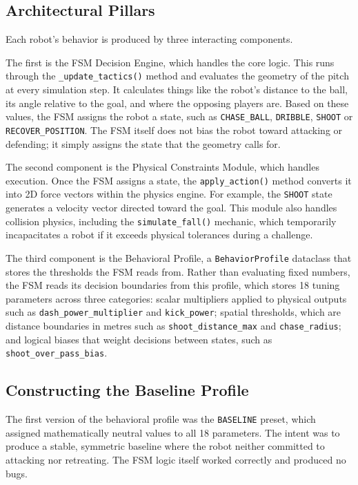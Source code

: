 \documentclass[12pt, a4paper]{report}
\begin{document}
\subsection{Architectural Pillars}

Each robot's behavior is produced by three interacting components.

The first is the FSM Decision Engine, which handles the core logic.
This runs through the \texttt{\_update\_tactics()} method and evaluates
the geometry of the pitch at every simulation step.
It calculates things like the robot's distance to the ball, its angle
relative to the goal, and where the opposing players are.
Based on these values, the FSM assigns the robot a state, such as
\texttt{CHASE\_BALL}, \texttt{DRIBBLE}, \texttt{SHOOT} or
\texttt{RECOVER\_POSITION}.
The FSM itself does not bias the robot toward attacking or defending;
it simply assigns the state that the geometry calls for.

The second component is the Physical Constraints Module, which handles
execution.
Once the FSM assigns a state, the \texttt{apply\_action()} method converts
it into 2D force vectors within the physics engine.
For example, the \texttt{SHOOT} state generates a velocity vector directed
toward the goal.
This module also handles collision physics, including the
\texttt{simulate\_fall()} mechanic, which temporarily incapacitates a robot
if it exceeds physical tolerances during a challenge.

The third component is the Behavioral Profile, a \texttt{BehaviorProfile}
dataclass that stores the thresholds the FSM reads from.
Rather than evaluating fixed numbers, the FSM reads its decision boundaries
from this profile, which stores 18 tuning parameters across three categories:
scalar multipliers applied to physical outputs such as
\texttt{dash\_power\_multiplier} and \texttt{kick\_power};
spatial thresholds, which are distance boundaries in metres such as
\texttt{shoot\_distance\_max} and \texttt{chase\_radius}; and
logical biases that weight decisions between states, such as
\texttt{shoot\_over\_pass\_bias}.

\subsection{Constructing the Baseline Profile}

The first version of the behavioral profile was the \texttt{BASELINE} preset,
which assigned mathematically neutral values to all 18 parameters.
The intent was to produce a stable, symmetric baseline where the robot
neither committed to attacking nor retreating.
The FSM logic itself worked correctly and produced no bugs.
\end{document}
